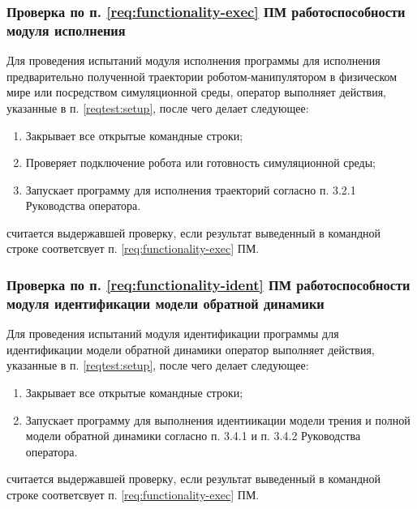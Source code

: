 \subsubsection{Проверка по п. \ref{req:functionality-exec} ПМ работоспособности модуля исполнения} \label{reqtest:functionality-exec}
Для проведения испытаний модуля исполнения программы \productname для исполнения предварительно полученной траектории роботом-манипулятором в физическом мире или посредством симуляционной среды, оператор выполняет действия, указанные в п. \ref{reqtest:setup}, после чего делает следующее:
\begin{enumerate}
    \item Закрывает все открытые командные строки;
    \item Проверяет подключение робота или готовность симуляционной среды;
    \item Запускает программу для исполнения траекторий согласно п. 3.2.1 Руководства оператора.
\end{enumerate}
\programname считается выдержавшей проверку, если результат выведенный в командной строке соответсвует п. \ref{req:functionality-exec} ПМ.

\subsubsection{Проверка по п. \ref{req:functionality-ident} ПМ  работоспособности модуля идентификации модели обратной динамики} \label{reqtest:functionality-ident}
Для проведения испытаний модуля идентификации программы \productname для идентификации модели обратной динамики оператор выполняет действия, указанные в п. \ref{reqtest:setup}, после чего делает следующее:
\begin{enumerate}
    \item Закрывает все открытые командные строки;
    \item Запускает программу для выполнения идентиикации модели трения и полной модели обратной динамики согласно п. 3.4.1 и п. 3.4.2 Руководства оператора.
\end{enumerate}
\programname считается выдержавшей проверку, если результат выведенный в командной строке соответсвует п. \ref{req:functionality-exec} ПМ.

